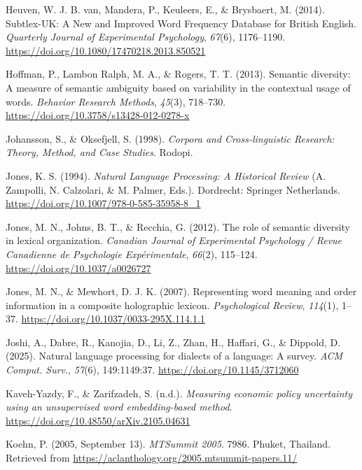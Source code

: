 \documentclass[
  english,
  man,floatsintext]{apa6}
\newlength{\cslhangindent}
\newenvironment{CSLReferences}[2] %
 {\begin{list}{}{%
  \setlength{\itemindent}{0pt}
  \setlength{\leftmargin}{0pt}
  \setlength{\parsep}{0pt}
  \ifodd #1
   \setlength{\leftmargin}{\cslhangindent}
   \setlength{\itemindent}{-1\cslhangindent}
  \fi
  \setlength{\itemsep}{#2\baselineskip}}}
 {\end{list}}
\begin{document}
\begin{CSLReferences}{1}{0}
Heuven, W. J. B. van, Mandera, P., Keuleers, E., \& Brysbaert, M. (2014). Subtlex-UK: A New and Improved Word Frequency Database for British English. \emph{Quarterly Journal of Experimental Psychology}, \emph{67}(6), 1176--1190. \url{https://doi.org/10.1080/17470218.2013.850521}

Hoffman, P., Lambon Ralph, M. A., \& Rogers, T. T. (2013). Semantic diversity: A measure of semantic ambiguity based on variability in the contextual usage of words. \emph{Behavior Research Methods}, \emph{45}(3), 718--730. \url{https://doi.org/10.3758/s13428-012-0278-x}

Johansson, S., \& Oksefjell, S. (1998). \emph{Corpora and Cross-linguistic Research: Theory, Method, and Case Studies}. Rodopi.

Jones, K. S. (1994). \emph{Natural Language Processing: A Historical Review} (A. Zampolli, N. Calzolari, \& M. Palmer, Eds.). Dordrecht: Springer Netherlands. \url{https://doi.org/10.1007/978-0-585-35958-8_1}

Jones, M. N., Johns, B. T., \& Recchia, G. (2012). The role of semantic diversity in lexical organization. \emph{Canadian Journal of Experimental Psychology / Revue Canadienne de Psychologie Expérimentale}, \emph{66}(2), 115--124. \url{https://doi.org/10.1037/a0026727}

Jones, M. N., \& Mewhort, D. J. K. (2007). Representing word meaning and order information in a composite holographic lexicon. \emph{Psychological Review}, \emph{114}(1), 1--37. \url{https://doi.org/10.1037/0033-295X.114.1.1}

Joshi, A., Dabre, R., Kanojia, D., Li, Z., Zhan, H., Haffari, G., \& Dippold, D. (2025). Natural language processing for dialects of a language: A survey. \emph{ACM Comput. Surv.}, \emph{57}(6), 149:1149:37. \url{https://doi.org/10.1145/3712060}

Kaveh-Yazdy, F., \& Zarifzadeh, S. (n.d.). \emph{Measuring economic policy uncertainty using an unsupervised word embedding-based method}. \url{https://doi.org/10.48550/arXiv.2105.04631}

Koehn, P. (2005, September 13). \emph{MTSummit 2005}. 7986. Phuket, Thailand. Retrieved from \url{https://aclanthology.org/2005.mtsummit-papers.11/}


\end{CSLReferences}
\end{document}
